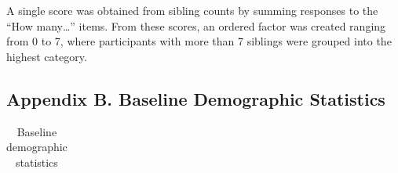 \documentclass[
  single column]{article}
\begin{document}
A single score was obtained from sibling counts by summing responses to
the ``How many\ldots{}'' items. From these scores, an ordered factor was
created ranging from 0 to 7, where participants with more than 7
siblings were grouped into the highest category.

\newpage{}

\subsection{Appendix B. Baseline Demographic
Statistics}\label{appendix-demographics}

\begin{longtable}[]{@{}ll@{}}

\caption{\label{tbl-table-demography}Baseline demographic statistics}

\tabularnewline


\end{longtable}
\end{document}
